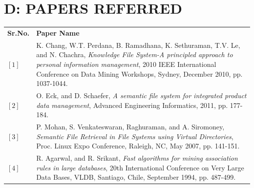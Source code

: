 {}
\chapter*{D: PAPERS REFERRED}

\begin{tabular}{p{1cm}  p{12cm}} 
\textbf{Sr.No.} & \textbf{Paper Name} \\ 
$[1]$ & K. Chang, W.T. Perdana, B. Ramadhana, K. Sethuraman, T.V. Le, and N. Chachra, 
\emph{Knowledge File System-A principled approach to personal information management},
2010 IEEE International Conference on Data Mining Workshops, Sydney, December 2010, pp. 1037-1044. \\ 
$[2]$ & O. Eck, and D. Schaefer, 
\emph{A semantic file system for integrated product data management}, Advanced Engineering Informatics, 2011, pp. 177-184. \\ 
$[3]$ & P. Mohan, S. Venkateswaran, Raghuraman, and A. Siromoney, 
\emph{Semantic File Retrieval in File Systems using Virtual Directories},
Proc. Linux Expo Conference, Raleigh, NC, May 2007, pp. 141-151. \\ 
$[4]$ & R. Agarwal, and R. Srikant, 
\emph{Fast algorithms for mining association rules in large databases},
20th International Conference on Very Large Data Bases, VLDB, Santiago, Chile, September 1994, pp. 487-499. \\ 
\end{tabular}

